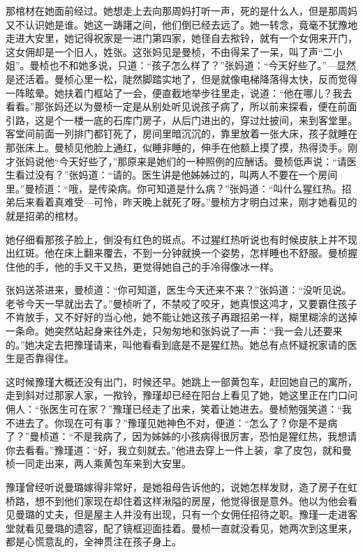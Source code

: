 \par 那棺材在她面前经过。她想走上去向那周妈打听一声，死的是什么人，但是那周妈又不认识她是谁。她这一踌躇之间，他们倒已经去远了。她一转念，竟毫不犹豫地走进大安里，她记得祝家是一进门第四家，她径自去揿铃，就有一个女佣来开门，这女佣却是一个旧人，姓张。这张妈见是曼桢，不由得呆了一呆，叫了声“二小姐”。曼桢也不和她多说，只道：“孩子怎么样了？”张妈道：“今天好些了。”—显然是还活着。曼桢心里一松，陡然脚踏实地了，但是就像电梯降落得太快，反而觉得一阵眩晕。她扶着门框站了一会，便直截地举步往里走，说道：“他在哪儿？我去看看。”那张妈还以为曼桢一定是从别处听见说孩子病了，所以前来探看，便在前面引路，这是个一楼一底的石库门房子，从后门进出的，穿过灶披间，来到客堂里。客堂间前面一列排门都钉死了，房间里暗沉沉的，靠里放着一张大床，孩子就睡在那张床上。曼桢见他脸上通红，似睡非睡的，伸手在他额上摸了摸，热得烫手。刚才张妈说他“今天好些了，”那原来是她们的一种照例的应酬话。曼桢低声说：“请医生看过没有？”张妈道：“请的。医生讲是他姊姊过的，叫两人不要在一个房间里。”曼桢道：“哦，是传染病。你可知道是什么病？”张妈道：“叫什么猩红热。招弟后来看着真难受—可怜，昨天晚上就死了呀。”曼桢方才明白过来，刚才她看见的就是招弟的棺材。
\par 她仔细看那孩子脸上，倒没有红色的斑点。不过猩红热听说也有时候皮肤上并不现出红斑。他在床上翻来覆去，不到一分钟就换一个姿势，怎样睡也不舒服。曼桢握住他的手，他的手又干又热，更觉得她自己的手冷得像冰一样。
\par 张妈送茶进来，曼桢道：“你可知道，医生今天还来不来？”张妈道：“没听见说。老爷今天一早就出去了。”曼桢听了，不禁咬了咬牙，她真恨这鸿才，又要霸住孩子不肯放手，又不好好的当心他，她不能让她这孩子再跟招弟一样，糊里糊涂的送掉一条命。她突然站起身来往外走，只匆匆地和张妈说了一声：“我一会儿还要来的。”她决定去把豫瑾请来，叫他看看到底是不是猩红热。她总有点怀疑祝家请的医生是否靠得住。
\par 这时候豫瑾大概还没有出门，时候还早。她跳上一部黄包车，赶回她自己的寓所，走到斜对过那家人家，一揿铃，豫瑾却已经在阳台上看见了她，她这里正在门口问佣人：“张医生可在家？”豫瑾已经走了出来，笑着让她进去。曼桢勉强笑道：“我不进去了。你现在可有事？”豫瑾见她神色不对，便道：“怎么了？你是不是病了？”曼桢道：“不是我病了，因为姊姊的小孩病得很厉害，恐怕是猩红热，我想请你去看看。”豫瑾道：“好，我立刻就去。”他进去穿上一件上装，拿了皮包，就和曼桢一同走出来，两人乘黄包车来到大安里。
\par 豫瑾曾经听说曼璐嫁得非常好，是她祖母告诉他的，说她怎样发财，造了房子在虹桥路，想不到他们家现在却住着这样湫隘的房屋，他觉得很是意外。他以为他会看见曼璐的丈夫，但是屋主人并没有出现，只有一个女佣任招待之职。豫瑾一走进客堂就看见曼璐的遗容，配了镜框迎面挂着。曼桢一直就没看见，她两次到这里来，都是心慌意乱的，全神贯注在孩子身上。
